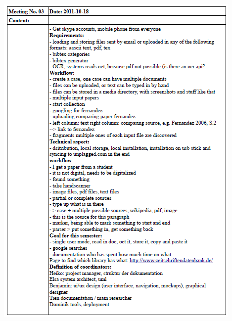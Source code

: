 \begin{appendix}
    \includegraphics[width=\textwidth]{images/a_meetings/meeting_03.png}



\end{appendix}
